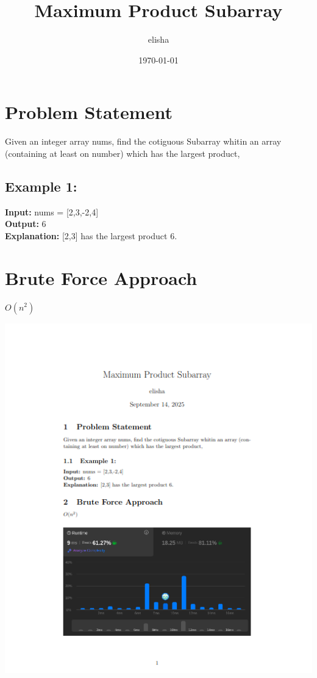\documentclass{article}
\author{elisha}
\title{Maximum Product Subarray }
\date{\today}
\begin{document}
\maketitle
\section{Problem Statement}
Given an integer array nums, find the cotiguous Subarray
whitin an array (containing at least on number) which has the largest product,
\subsection{Example 1:}
\textbf{Input:} nums = [2,3,-2,4]\\
\textbf{Output:} 6\\
\textbf{Explanation:} [2,3] has the largest product 6.
\section{Brute Force Approach}
 $O(n^2)$\\
 \begin{center}
    \includegraphics[width=1\textwidth]{explain.png}
\end{center}
\end{document}
